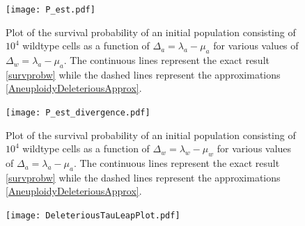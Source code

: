 \documentclass[11pt,a4paper]{article}
\begin{document}
\begin{figure}[!t]
 \vspace*{1\baselineskip}
\texttt{[image: P\_est.pdf]}
\caption{Plot of the survival probability of an initial population consisting of $10^{4}$ wildtype cells as a function of $\Delta_a=\lambda_a-\mu_a$ for various values of $\Delta_w=\lambda_a-\mu_a$. The continuous lines represent the exact result \eqref{survprobw} while the dashed lines represent the approximations \eqref{AneuploidyDeleteriousApprox}.}
\label{P_est}
\end{figure}
\begin{figure}[!t]
 \vspace*{1\baselineskip}
\texttt{[image: P\_est\_divergence.pdf]}
\caption{Plot of the survival probability of an initial population consisting of $10^{4}$ wildtype cells as a function of $\Delta_w=\lambda_w-\mu_w$ for various values of $\Delta_a=\lambda_a-\mu_a$. The continuous lines represent the exact result \eqref{survprobw} while the dashed lines represent the approximations \eqref{AneuploidyDeleteriousApprox}.}
\label{P_est}
\end{figure}
\begin{figure}[!t]
 \vspace*{1\baselineskip}
\texttt{[image: DeleteriousTauLeapPlot.pdf]}
\caption{}
\label{DeleteriousPlot}
\end{figure}
\end{document}
